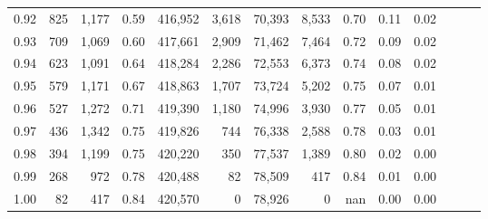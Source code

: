 \begin{tabular}{rrrrrrrrrrrrrr}
0.92 &    825 &  1,177 &  0.59 &  416,952 &    3,618 &  70,393 &   8,533 &  0.70 &  0.11 &      0.02 \\
0.93 &    709 &  1,069 &  0.60 &  417,661 &    2,909 &  71,462 &   7,464 &  0.72 &  0.09 &      0.02 \\
0.94 &    623 &  1,091 &  0.64 &  418,284 &    2,286 &  72,553 &   6,373 &  0.74 &  0.08 &      0.02 \\
0.95 &    579 &  1,171 &  0.67 &  418,863 &    1,707 &  73,724 &   5,202 &  0.75 &  0.07 &      0.01 \\
0.96 &    527 &  1,272 &  0.71 &  419,390 &    1,180 &  74,996 &   3,930 &  0.77 &  0.05 &      0.01 \\
0.97 &    436 &  1,342 &  0.75 &  419,826 &      744 &  76,338 &   2,588 &  0.78 &  0.03 &      0.01 \\
0.98 &    394 &  1,199 &  0.75 &  420,220 &      350 &  77,537 &   1,389 &  0.80 &  0.02 &      0.00 \\
0.99 &    268 &    972 &  0.78 &  420,488 &       82 &  78,509 &     417 &  0.84 &  0.01 &      0.00 \\
1.00 &     82 &    417 &  0.84 &  420,570 &        0 &  78,926 &       0 &   nan &  0.00 &      0.00 \\
\bottomrule
\end{tabular}
